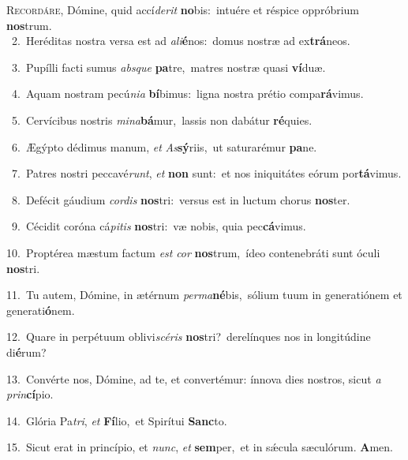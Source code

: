 \lettrine{\initial\textcolor{\initialcolor}{R}}{ecordáre,} Dómine, quid accí\-\textit{de}\-\textit{rit} \textbf{no}\-bis:~\star intuére et réspice oppróbrium \textbf{nos}\-trum.\\
{\numbfont\textcolor{\numbcolor}{~2.}}~Heréditas nostra versa est ad \textit{a}\-\textit{li}\textbf{é}nos:~\star domus nostræ ad ex\-\textbf{trá}\-neos.\par
{\numbfont\textcolor{\numbcolor}{~3.}}~Pupílli facti sumus \textit{abs}\-\textit{que} \textbf{pa}\-tre,~\star matres nostræ quasi \textbf{ví}\-duæ.\par
{\numbfont\textcolor{\numbcolor}{~4.}}~Aquam nostram pecú\-\textit{ni}\-\textit{a} \textbf{bí}\-bimus:~\star ligna nostra prétio compa\-\textbf{rá}\-vimus.\par
{\numbfont\textcolor{\numbcolor}{~5.}}~Cervícibus nostris \textit{mi}\-\textit{na}\textbf{bá}mur,~\star lassis non dabátur \textbf{ré}\-quies.\par
{\numbfont\textcolor{\numbcolor}{~6.}}~Ægýpto dédimus manum, \textit{et} \textit{As}\-\textbf{sý}riis,~\star ut saturarémur \textbf{pa}\-ne.\par
{\numbfont\textcolor{\numbcolor}{~7.}}~Patres nostri peccavé\-\textit{runt}\-, \textit{et} \textbf{non} sunt:~\star et nos iniquitátes eórum por\-\textbf{tá}\-vimus.\par
{\numbfont\textcolor{\numbcolor}{~8.}}~Defécit gáudium \textit{cor}\-\textit{dis} \textbf{nos}\-tri:~\star versus est in luctum chorus \textbf{nos}\-ter.\par
{\numbfont\textcolor{\numbcolor}{~9.}}~Cécidit coróna cá\-\textit{pi}\-\textit{tis} \textbf{nos}\-tri:~\star væ nobis, quia pec\-\textbf{cá}\-vimus.\par
{\numbfont\textcolor{\numbcolor}{10.}}~Proptérea mæstum factum \textit{est} \textit{cor} \textbf{nos}\-trum,~\star ídeo contenebráti sunt óculi \textbf{nos}\-tri.\par
{\numbfont\textcolor{\numbcolor}{11.}}~Tu autem, Dómine, in ætérnum \textit{per}\-\textit{ma}\textbf{né}bis,~\star sólium tuum in generatiónem et generati\-\textbf{ó}\-nem.\par
{\numbfont\textcolor{\numbcolor}{12.}}~Quare in perpétuum oblivi\-\textit{scé}\-\textit{ris} \textbf{nos}\-tri?~\star derelínques nos in longitúdine di\-\textbf{é}\-rum?\par
{\numbfont\textcolor{\numbcolor}{13.}}~Convérte nos, Dómine, ad te, et convertémur: ínnova dies nostros, sicut \textit{a} \textit{prin}\-\textbf{cí}pio.\par
{\numbfont\textcolor{\numbcolor}{14.}}~Glória Pa\-\textit{tri}\-, \textit{et} \textbf{Fí}\-lio,~\star et Spirítui \textbf{Sanc}\-to.\par
{\numbfont\textcolor{\numbcolor}{15.}}~Sicut erat in princípio, et \textit{nunc}\-, \textit{et} \textbf{sem}\-per,~\star et in sǽcula sæculórum. \textbf{A}\-men.\par
